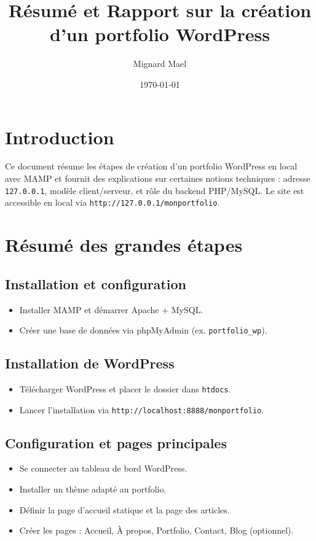 \documentclass[a4paper,12pt]{article}
\title{Résumé et Rapport sur la création d’un portfolio WordPress}
\author{Mignard Mael}
\date{\today}
\begin{document}
\maketitle
\tableofcontents

\section*{Introduction}
Ce document résume les étapes de création d’un portfolio WordPress en local 
avec MAMP et fournit des explications sur certaines notions techniques : 
adresse \texttt{127.0.0.1}, modèle client/serveur, et rôle du backend PHP/MySQL. 
Le site est accessible en local via \texttt{http://127.0.0.1/monportfolio}.

\section{Résumé des grandes étapes}

\subsection*{Installation et configuration}
\begin{itemize}
    \item Installer MAMP et démarrer Apache + MySQL.
    \item Créer une base de données via phpMyAdmin (ex. \texttt{portfolio\_wp}).
\end{itemize}

\subsection*{Installation de WordPress}
\begin{itemize}
    \item Télécharger WordPress et placer le dossier dans \texttt{htdocs}.
    \item Lancer l’installation via \texttt{http://localhost:8888/monportfolio}.
\end{itemize}

\subsection*{Configuration et pages principales}
\begin{itemize}
    \item Se connecter au tableau de bord WordPress.
    \item Installer un thème adapté au portfolio.
    \item Définir la page d’accueil statique et la page des articles.
    \item Créer les pages : Accueil, À propos, Portfolio, Contact, Blog (optionnel).
\end{itemize}
\end{document}

